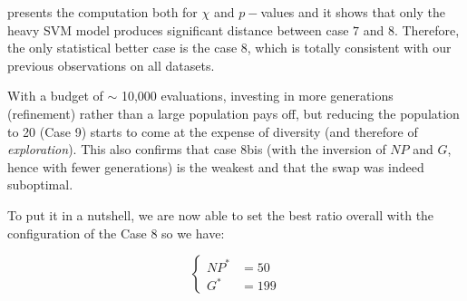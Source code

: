 \documentclass[12pt, openany]{article}
\begin{document}
 presents the computation both for $\chi$ and $p-$values and it shows that only the heavy SVM model produces significant distance between case $7$ and $8$. Therefore, the only statistical better case is the case 8, which is totally consistent with our previous observations on all datasets.

With a budget of $\sim$ 10,000 evaluations, investing in more generations (refinement) rather than a large population pays off, but reducing the population to 20 (Case 9) starts to come at the expense of diversity (and therefore of \emph{exploration}). This also confirms that case 8bis (with the inversion of $NP$ and $G$, hence with fewer generations) is the weakest and that the swap was indeed suboptimal.

\begin{table}[H]
    \centering
    \renewcommand{\arraystretch}{1.3}
    \caption{\textbf{Summary of statistical significance tests for population/generation ratios.} Statistically significant $p$-values ($<0.05$) are highlighted in bold. The Critical Difference (CD) dictates the threshold for Nemenyi pairwise significance.}
    \label{tab:statistical_tests_popgen_bde}
\end{table}

To put it in a nutshell, we are now able to set the best ratio overall with the configuration of the Case 8 so we have:

\[
\boxed{
    \begin{cases}
        NP^*&=50\\
        G^*&=199
    \end{cases}
}
\]
\end{document}
